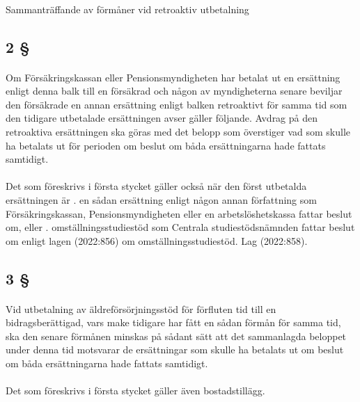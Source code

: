 \documentclass[a4paper,notitlepage,openany,10pt]{book}
\begin{document}
\paragraph*{}
Sammanträffande av förmåner vid retroaktiv utbetalning
\subsection*{2 §}
\paragraph*{}
Om Försäkringskassan eller Pensionsmyndigheten har betalat ut en ersättning enligt denna balk till en försäkrad och någon av myndigheterna senare beviljar den försäkrade en annan ersättning enligt balken retroaktivt för samma tid som den tidigare utbetalade ersättningen avser gäller följande. Avdrag på den retroaktiva ersättningen ska göras med det belopp som överstiger vad som skulle ha betalats ut för perioden om beslut om båda ersättningarna hade fattats samtidigt.
\paragraph*{}
Det som föreskrivs i första stycket gäller också när den först utbetalda ersättningen är
. en sådan ersättning enligt någon annan författning som Försäkringskassan, Pensionsmyndigheten eller en arbetslöshetskassa fattar beslut om, eller
. omställningsstudiestöd som Centrala studiestödsnämnden fattar beslut om enligt lagen (2022:856) om omställningsstudiestöd.
Lag (2022:858).
\subsection*{3 §}
\paragraph*{}
Vid utbetalning av äldreförsörjningsstöd för förfluten tid till en bidragsberättigad, vars make tidigare har fått en sådan förmån för samma tid, ska den senare förmånen minskas på sådant sätt att det sammanlagda beloppet under denna tid motsvarar de ersättningar som skulle ha betalats ut om beslut om båda ersättningarna hade fattats samtidigt.
\paragraph*{}
Det som föreskrivs i första stycket gäller även bostadstillägg.
\end{document}
